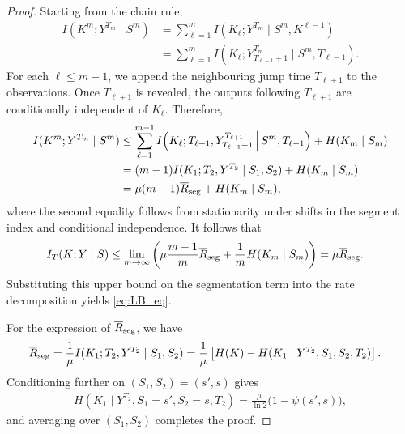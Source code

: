 \documentclass[onecolumn]{IEEEtran}
\theoremstyle{definition}
\begin{document}
\begin{proof}
Starting from the chain rule,
\begin{align*}
    I(K^m;Y^{T_m}\mid S^m)
    &= \sum_{\ell=1}^m
    I(K_\ell;Y^{T_m}\mid S^m,K^{\ell-1}) \\
    &= \sum_{\ell=1}^m
    I(K_\ell;Y_{T_{\ell-1}+1}^{T_m}
    \mid S^m,T_{\ell-1}).
\end{align*}
For each $\ell\leq m-1$, we append the neighbouring jump time
$T_{\ell+1}$ to the observations. Once $T_{\ell+1}$ is revealed, the
outputs following $T_{\ell+1}$ are conditionally independent of
$K_\ell$. Therefore,
\begin{align*}
    I(K^m;Y^{T_m}\mid S^m) &\leq
    \sum_{\ell=1}^{m-1}
    I\!\left(
        K_\ell;
        {T_{\ell+1}},Y_{T_{\ell-1}+1}^{T_{\ell+1}}
        \,\middle|\,
        S^m,T_{\ell-1}
    \right) + {H(K_m\mid S_m)} \\
    &=
    (m-1)
    I(K_1;{T_2},Y^{T_2}\mid S_1,S_2)
    +{H(K_m\mid S_m)} \\
    &=
    \mu(m-1)\overline{R}_{\rm seg}
    +{H(K_m\mid S_m)},
\end{align*}
where the second equality follows from stationarity under shifts in the
segment index and conditional independence. It follows that
\begin{align*}
    I_T(K;Y\mid S)
    &\leq
    \lim_{m\rightarrow\infty}
    \left(
        \mu\frac{m-1}{m}\overline{R}_{\rm seg}
        +{\frac{1}{m}H(K_m\mid S_m)}
    \right) =\mu\overline{R}_{\rm seg}.
\end{align*}
Substituting this upper bound on the segmentation term into the rate
decomposition yields \eqref{eq:LB_eq}.

For the expression of $\overline{R}_{\rm seg}$, we have
\begin{align*}
    \overline{R}_{\rm seg}
    &=
    \frac{1}{\mu}
    I(K_1;T_2,Y^{T_2}\mid S_1,S_2) =
    \frac{1}{\mu}
    \left[
        H(K)
        -H(K_1\mid Y^{T_2},S_1,S_2,T_2)
    \right].
\end{align*}
Conditioning further on $(S_1,S_2)=(s',s)$ gives
\begin{align}
    H(K_1\mid Y^{T_2},S_1=s',S_2=s,T_2)
    =
    \frac{\mu}{\ln 2}
    \bigl(1-\overline{\psi}(s',s)\bigr),\label{eq:two-segment-ent}
\end{align}
and averaging over $(S_1,S_2)$ completes the proof.
\end{proof}
\end{document}
